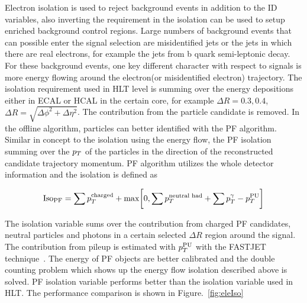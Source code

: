 Electron isolation is used to reject background events in addition to the ID variables, also inverting the requirement in the isolation can be used to setup enriched background control regions. Large numbers of background events that can possible enter the signal selection are misidentified jets or the jets in which there are real electrons, for example the jets from b quark semi-leptonic decay. For these background events, one key different character with respect to signals is more energy flowing around the electron(or misidentified electron) trajectory. The isolation requirement used in HLT level is summing over the energy depositions either in ECAL or HCAL in the certain core, for example $\Delta R=0.3,0.4$, $\Delta R=\sqrt{\Delta \phi^{2}+\Delta\eta^{2}}$. The contribution from the particle candidate is removed. In the offline algorithm, particles can better identified with the PF algorithm. Similar in concept to the isolation using the energy flow, the PF isolation summing over the $p_{T}$ of the particles in the direction of the reconstructed candidate trajectory momentum. PF algorithm utilizes the whole detector information and the isolation is defined as

\begin{align*}
\textrm{Iso}_{\textrm{PF}}=\sum p_{T}^{\textrm{charged}}+\textrm{max}\bigg[ 0,\sum p_{T}^{\textrm{neutral~had}} +\sum p_{T}^{\gamma}-p_{T}^{\textrm{PU}}\bigg]
\end{align*}

The isolation variable sums over the contribution from charged PF candidates, neutral particles and photons in a certain selected $\Delta R$ region around the signal. The contribution from pileup is estimated with $p_{T}^{\textrm{PU}}$ with the FASTJET technique~\cite{FastJetalso}. The energy of PF objects are better calibrated and the double counting problem which shows up the energy flow isolation described above is solved. PF isolation variable performs better than the isolation variable used in HLT. The performance comparison is shown in Figure.~\ref{fig:eleIso}


